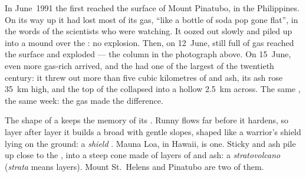\begin{example}\label{ex:g7:volcanoes:pinatubo}
In June~1991 the first  reached the surface of Mount Pinatubo, in the
Philippines. On its way up it had lost most of its gas, ``like a bottle of
soda pop gone flat'', in the words of the scientists who were watching. It
oozed out slowly and piled up into a mound over the : no explosion.
Then, on 12~June,  still full of gas reached the surface and
exploded --- the column in the photograph above. On 15~June, even more
gas-rich  arrived, and the  had one of the largest 
of the twentieth century: it threw out more than five cubic kilometres of
 and ash, its ash  rose \qty{35}{km} high, and the top of the
 collapsed into a hollow \qty{2.5}{km} across. The same ,
the same week: the gas made the difference.
\end{example}

The shape of a  keeps the memory of its . Runny  flows
far before it hardens, so layer after layer it builds a broad  with
gentle slopes, shaped like a warrior's shield lying on the ground: a
\emph{shield }. Mauna Loa, in Hawaii, is one. Sticky  and ash
pile up close to the , into a steep cone made of layers of  and
ash: a \emph{stratovolcano} (\emph{strata} means layers). Mount St.~Helens
and Pinatubo are two of them.


